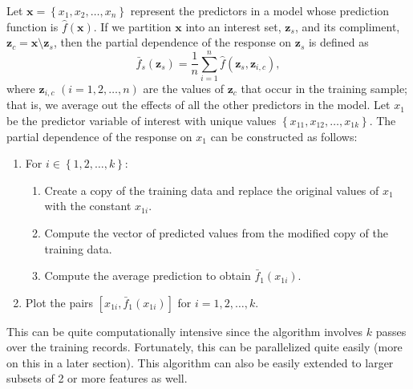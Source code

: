 
Let $\boldsymbol{x} = \left\{x_1, x_2, \dots, x_n\right\}$ represent the predictors in a model whose prediction function is $\widehat{f}\left(\boldsymbol{x}\right)$. If we partition $\boldsymbol{x}$ into an interest set, $\boldsymbol{z}_s$, and its compliment, $\boldsymbol{z}_{c} = \boldsymbol{x} \setminus \boldsymbol{z}_s$, then the partial dependence of the response on $\boldsymbol{z}_s$ is defined as
\begin{equation}
\label{eqn:pdf}
\bar{f}_s\left(\boldsymbol{z}_s\right) = \frac{1}{n}\sum_{i = 1}^n\widehat{f}\left(\boldsymbol{z}_s,\boldsymbol{z}_{i, c}\right),
\end{equation}
where $\boldsymbol{z}_{i, c}$ $\left(i = 1, 2, \dots, n\right)$ are the values of $\boldsymbol{z}_c$ that occur in the training sample; that is, we average out the effects of all the other predictors in the model. Let $x_1$ be the predictor variable of interest with unique values $\left\{x_{11}, x_{12}, \dots, x_{1k}\right\}$. The partial dependence of the response on $x_1$ can be constructed as follows:
\begin{enumerate}
  \item For $i \in \left\{1, 2, \dots, k\right\}$:
  \begin{enumerate}
    \item Create a copy of the training data and replace the original values of $x_1$ with the constant $x_{1i}$.
    \item Compute the vector of predicted values from the modified copy of the training data.
    \item Compute the average prediction to obtain $\bar{f}_1\left(x_{1i}\right)$.
  \end{enumerate}
  \item Plot the pairs $\left[x_{1i}, \bar{f}_1\left(x_{1i}\right)\right]$ for $i = 1, 2, \dotsc, k$.
\end{enumerate}
This can be quite computationally intensive since the algorithm involves $k$ passes over the training records. Fortunately, this can be parallelized quite easily (more on this in a later section). This algorithm can also be easily extended to larger subsets of 2 or more features as well.


